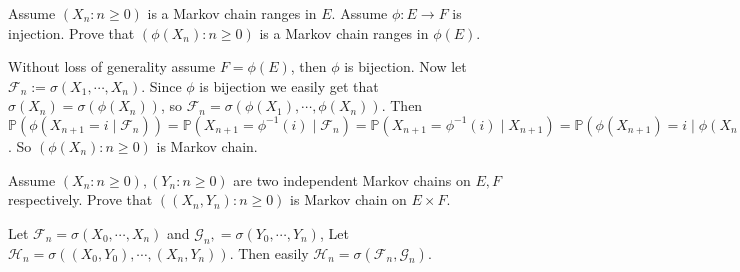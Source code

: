 \documentclass{ctexart}
\begin{document}
\begin{problem}\label{pro:3}
  Assume \((X_n:n \geq 0)\) is a Markov chain ranges in \(E\).
  Assume \(\phi:E \to F\) is injection.
  Prove that \((\phi(X_n):n \geq 0)\) is a Markov chain ranges in \(\phi(E)\).
\end{problem}
\begin{solution}
  Without loss of generality assume \(F=\phi(E)\), then \(\phi\) is bijection.
  Now let \(\mathcal{F}_n:=\sigma(X_1,\cdots,X_n)\).
  Since \(\phi\) is bijection we easily get that \(\sigma(X_n)=\sigma(\phi(X_n))\), so \(\mathcal{F}_n=\sigma(\phi(X_1),\cdots,\phi(X_n))\).
  Then \(\mathbb{P}(\phi(X_{n+1} =i \mid \mathcal{F}_n))=\mathbb{P}(X_{n+1}=\phi^{-1}(i) \mid \mathcal{F}_n)=\mathbb{P}(X_{n+1}=\phi^{-1}(i) \mid X_{n+1})=\mathbb{P}(\phi(X_{n+1})=i \mid \phi(X_n))\).
  So \((\phi(X_n):n \geq 0)\) is Markov chain.
\end{solution}
\begin{problem}\label{pro:4}
  Assume \((X_n:n \geq 0),(Y_n:n \geq 0)\) are two independent Markov chains on \(E,F\) respectively.
  Prove that \(((X_n,Y_n): n \geq 0)\) is Markov chain on \(E \times F\).
\end{problem}
\begin{solution}
  Let \(\mathcal{F}_n=\sigma(X_0,\cdots,X_n)\) and \(\mathcal{G}_n,=\sigma(Y_0,\cdots,Y_n)\),
  Let \(\mathcal{H}_n=\sigma((X_0,Y_0),\cdots,(X_n,Y_n))\).
  Then easily \(\mathcal{H}_n=\sigma(\mathcal{F}_n,\mathcal{G}_n)\).

\end{solution}
\end{document}
